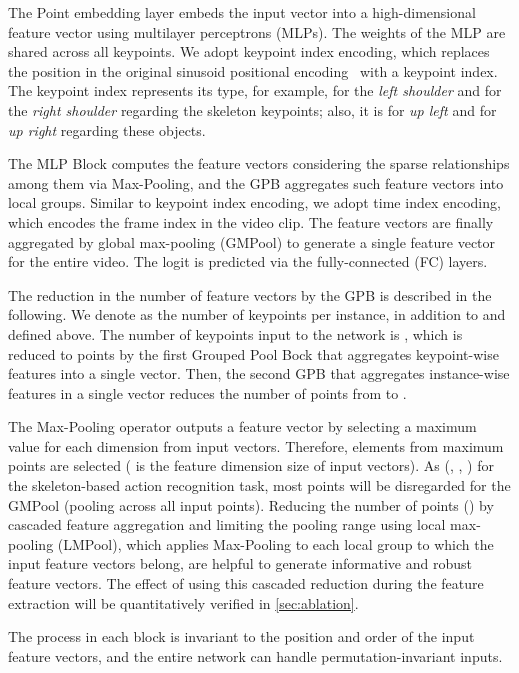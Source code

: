 \documentclass[10pt,twocolumn,letterpaper]{article}
\begin{document}
The Point embedding layer embeds the input vector into a high-dimensional feature vector using multilayer perceptrons (MLPs).
The weights of the MLP are shared across all keypoints.
We adopt keypoint index encoding, which replaces the position in the original sinusoid positional encoding~\cite{Vaswani2017Neurips} with a keypoint index.
The keypoint index represents its type, for example,  for the \textit{left shoulder} and  for the \textit{right shoulder} regarding the skeleton keypoints; also, it is  for \textit{up left} and  for \textit{up right} regarding these objects.

The MLP Block computes the feature vectors considering the sparse relationships among them via Max-Pooling, and the GPB aggregates such feature vectors into local groups.
Similar to keypoint index encoding, we adopt time index encoding, which encodes the frame index in the video clip.
The feature vectors are finally aggregated by global max-pooling (GMPool) to generate a single feature vector for the entire video.
The logit is predicted via the fully-connected (FC) layers.

The reduction in the number of feature vectors by the GPB is described in the following.
We denote  as the number of keypoints per instance, in addition to  and  defined above.
The number of keypoints input to the network is , which is reduced to  points by the first Grouped Pool Bock that aggregates  keypoint-wise features into a single vector.
Then, the second GPB that aggregates  instance-wise features in a single vector reduces the number of points from  to .

The Max-Pooling operator outputs a feature vector by selecting a maximum value for each dimension from  input vectors.
Therefore, elements from maximum  points are selected ( is the feature dimension size of input vectors).
As  (\eg, , ) for the skeleton-based action recognition task, most points will be disregarded for the GMPool (pooling across all input points).
Reducing the number of points () by cascaded feature aggregation and limiting the pooling range using local max-pooling (LMPool), which applies Max-Pooling to each local group to which the input feature vectors belong, are helpful to generate informative and robust feature vectors. The effect of using this cascaded reduction during the feature extraction will be quantitatively verified in \cref{sec:ablation}.

The process in each block is invariant to the position and order of the input feature vectors, and the entire network can handle permutation-invariant inputs.
\end{document}
